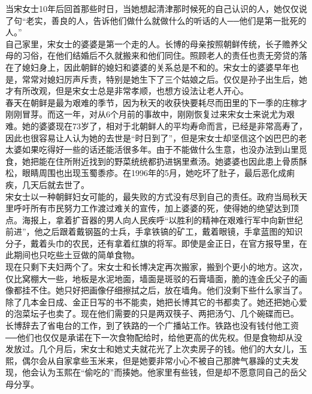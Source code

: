 当宋女士10年后回首那些时日，当她想起清津那时候死的自己认识的人，她仅仅说了句“老实，善良的人，告诉他们做什么就做什么的听话的人──他们是第一批死的人。”\\

自己家里，宋女士的婆婆是第一个走的人。长博的母亲按照朝鲜传统，长子赡养父母的习俗，在他们结婚后不久就搬来和他们同住。照顾老人的责任也责无旁贷的落在了媳妇身上，因此朝鲜的媳妇和婆婆的关系总是不和的。宋女士的婆婆早年也是，常常对媳妇厉声斥责，特别是她生下了三个姑娘之后。仅仅是孙子出生后，她才有所改观，但是宋女士总是非常孝顺，也想方设法让老人开心。\\

春天在朝鲜是最为艰难的季节，因为秋天的收获快要耗尽而田里的下一季的庄稼才刚刚冒芽。而这一年，对从6个月前的事故中，刚刚恢复过来宋女士来说尤为艰难。她的婆婆现在73岁了，相对于北朝鲜人的平均寿命而言，已经是非常高寿了，因此也很容易让人认为她的去世是“时日到了”，但是宋女士却坚信这个凶巴巴的老太婆如果吃得好一些的话还能活很多年。由于不能做什么生意，也没办法到山里觅食，她把能在住所附近找到的野菜统统都扔进锅里煮汤。她婆婆也因此患上骨质酥松，眼睛周围也出现玉蜀黍疹。在1996年的5月，她吃坏了肚子，最后恶化成痢疾，几天后就去世了。\\

宋女士以一种朝鲜妇女可能的，最失败的方式没有尽到自己的责任。政府当局秋天里呼吁所有市民努力工作渡过难关的宣传，加上婆婆的死，使得她的绝望达到顶点。海报上，拿着扩音器的男人向人民疾呼“以胜利的精神在艰难行军中向新世纪前进”，他之后跟着戴钢盔的士兵，手拿铁镐的矿工，戴着眼镜，手拿蓝图的知识分子，戴着头巾的农民，还有拿着红旗的将军。即使是金正日，在官方报导里，在此期间也只吃些土豆做的简单食物。\\

现在只剩下夫妇两个了。宋女士和长博决定再次搬家，搬到个更小的地方。这次，仅比窝棚大一些，地板是水泥地面，墙面是斑驳的石膏墙面，脆的连金氏父子的画像都挂不住。她只好把画像仔细擦拭之后，放在墙角。他们没剩下些什么家当了。除了几本金日成、金正日写的书不能卖，她把长博其它的书都卖了。她还把她心爱的泡菜坛子也卖了。现在他们需要的只是两双筷子、两把汤勺、几个碗碟而已。\\

长博辞去了省电台的工作，到了铁路的一个广播站工作。铁路也没有钱付他工资──他们也仅仅是承诺在下一次食物配给时，给他更高的优先权。但是食物却从没发放过。几个月后，宋女士和她丈夫就花光了上次卖房子的钱。他们的大女儿，玉熙，偶尔会从自家拿些玉米来，但是她要非常小心不被自己那脾气暴躁的丈夫发现，他会认为玉熙在“偷吃的”而揍她。他家里有些钱，但是却不愿意同自己的岳父母分享。\\

